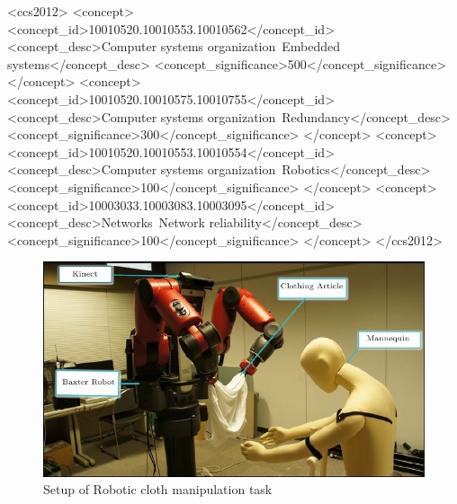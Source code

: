 \documentclass[sigconf]{acmart}
\begin{document}
%
%
\begin{CCSXML}
	<ccs2012>
	<concept>
	<concept_id>10010520.10010553.10010562</concept_id>
	<concept_desc>Computer systems organization~Embedded systems</concept_desc>
	<concept_significance>500</concept_significance>
	</concept>
	<concept>
	<concept_id>10010520.10010575.10010755</concept_id>
	<concept_desc>Computer systems organization~Redundancy</concept_desc>
	<concept_significance>300</concept_significance>
	</concept>
	<concept>
	<concept_id>10010520.10010553.10010554</concept_id>
	<concept_desc>Computer systems organization~Robotics</concept_desc>
	<concept_significance>100</concept_significance>
	</concept>
	<concept>
	<concept_id>10003033.10003083.10003095</concept_id>
	<concept_desc>Networks~Network reliability</concept_desc>
	<concept_significance>100</concept_significance>
	</concept>
	</ccs2012>
\end{CCSXML}





\maketitle

\begin{figure}
	\includegraphics[width=\linewidth]{setup}
	\caption{Setup of Robotic cloth manipulation task}
	\label{fig:setup}
\end{figure}
\end{document}
